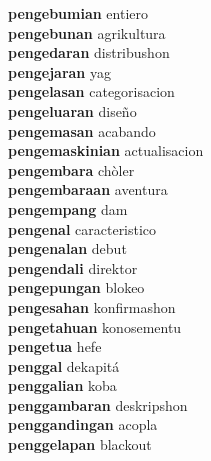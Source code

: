 \textbf{pengebumian } entiero \\
\textbf{pengebunan } agrikultura \\
\textbf{pengedaran } distribushon \\
\textbf{pengejaran } yag \\
\textbf{pengelasan } categorisacion \\
\textbf{pengeluaran } diseño \\
\textbf{pengemasan } acabando \\
\textbf{pengemaskinian } actualisacion \\
\textbf{pengembara } chòler \\
\textbf{pengembaraan } aventura \\
\textbf{pengempang } dam \\
\textbf{pengenal } caracteristico \\
\textbf{pengenalan } debut \\
\textbf{pengendali } direktor \\
\textbf{pengepungan } blokeo \\
\textbf{pengesahan } konfirmashon \\
\textbf{pengetahuan } konosementu \\
\textbf{pengetua } hefe \\
\textbf{penggal } dekapitá \\
\textbf{penggalian } koba \\
\textbf{penggambaran } deskripshon \\
\textbf{penggandingan } acopla \\
\textbf{penggelapan } blackout \\
